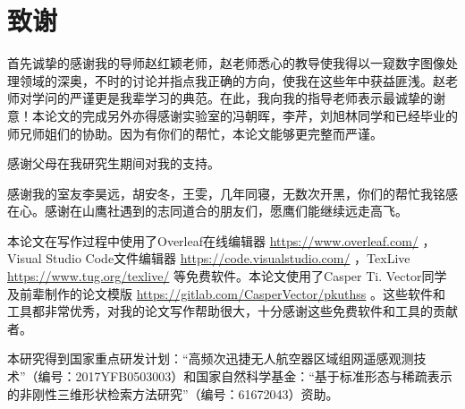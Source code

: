
\chapter{致谢}
首先诚挚的感谢我的导师赵红颖老师，赵老师悉心的教导使我得以一窥数字图像处理领域的深奥，不时的讨论并指点我正确的方向，使我在这些年中获益匪浅。赵老师对学问的严谨更是我辈学习的典范。在此，我向我的指导老师表示最诚挚的谢意！本论文的完成另外亦得感谢实验室的冯朝晖，李芹，刘旭林同学和已经毕业的师兄师姐们的协助。因为有你们的帮忙，本论文能够更完整而严谨。
\par
感谢父母在我研究生期间对我的支持。
\par
感谢我的室友李昊远，胡安冬，王雯，几年同寝，无数次开黑，你们的帮忙我铭感在心。感谢在山鹰社遇到的志同道合的朋友们，愿鹰们能继续远走高飞。
\par
本论文在写作过程中使用了Overleaf在线编辑器 \url{https://www.overleaf.com/} ，Visual Studio Code文件编辑器 \url{https://code.visualstudio.com/} ，TexLive \url{https://www.tug.org/texlive/} 等免费软件。本论文使用了Casper Ti. Vector同学及前辈制作的论文模版 \url{https://gitlab.com/CasperVector/pkuthss} 。这些软件和工具都非常优秀，对我的论文写作帮助很大，十分感谢这些免费软件和工具的贡献者。
\par
本研究得到国家重点研发计划：“高频次迅捷无人航空器区域组网遥感观测技术”（编号：2017YFB0503003）和国家自然科学基金：“基于标准形态与稀疏表示的非刚性三维形状检索方法研究”（编号：61672043）资助。


